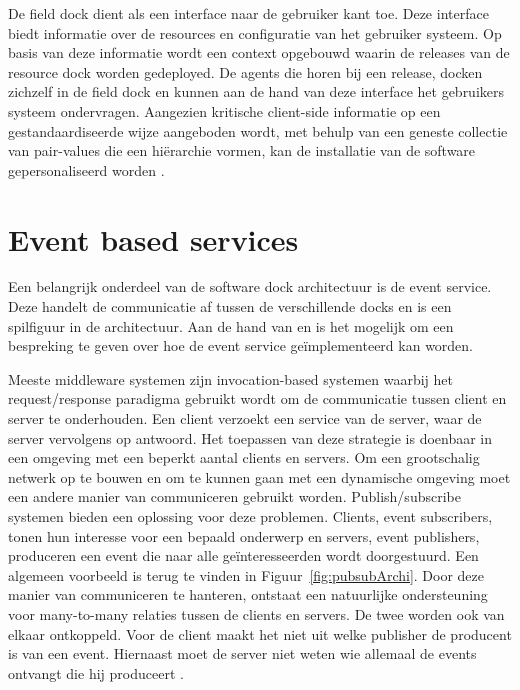 De field dock dient als een interface naar de gebruiker kant toe.
Deze interface biedt informatie over de resources en configuratie van het gebruiker systeem.
Op basis van deze informatie wordt een context opgebouwd waarin de releases van de resource dock worden gedeployed.
De agents die horen bij een release, docken zichzelf in de field dock en kunnen aan de hand van deze interface het gebruikers systeem ondervragen.
Aangezien kritische client-side informatie op een gestandaardiseerde wijze aangeboden wordt, met behulp van een geneste collectie van pair-values die een hiërarchie vormen, kan de installatie van de software gepersonaliseerd worden \citep{hall1999cooperative}.

\section{Event based services}\label{sec:event}
Een belangrijk onderdeel van de software dock architectuur is de event service.
Deze handelt de communicatie af tussen de verschillende docks en is een spilfiguur in de architectuur.
Aan de hand van \citet{pietzuch2002hermes} en \citet{carzaniga2001design} is het mogelijk om een bespreking te geven over hoe de event service geïmplementeerd kan worden.

Meeste middleware systemen zijn invocation-based systemen waarbij het request/response paradigma gebruikt wordt om de communicatie tussen client en server te onderhouden.
Een client verzoekt een service van de server, waar de server vervolgens op antwoord.
Het toepassen van deze strategie is doenbaar in een omgeving met een beperkt aantal clients en servers.
Om een grootschalig netwerk op te bouwen en om te kunnen gaan met een dynamische omgeving moet een andere manier van communiceren gebruikt worden.
Publish/subscribe systemen bieden een oplossing voor deze problemen.
Clients, event subscribers, tonen hun interesse voor een bepaald onderwerp en servers, event publishers, produceren een event die naar alle geïnteresseerden wordt doorgestuurd.
Een algemeen voorbeeld is terug te vinden in Figuur~\vref{fig:pubsubArchi}.
Door deze manier van communiceren te hanteren, ontstaat een natuurlijke ondersteuning voor many-to-many relaties tussen de clients en servers.
De twee worden ook van elkaar ontkoppeld.
Voor de client maakt het niet uit welke publisher de producent is van een event.
Hiernaast moet de server niet weten wie allemaal de events ontvangt die hij produceert \citep{pietzuch2002hermes}.

